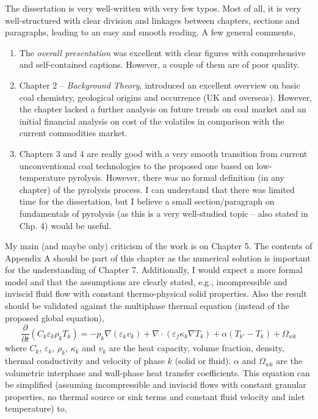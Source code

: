 \documentclass[14pt,twoside]{report}
\begin{document}
The dissertation is very well-written with very few typos. Most of all, it is very well-structured with clear division and linkages between chapters, sections and paragraphs, leading to an easy and smooth reading. A few general comments,
\begin{enumerate}
%
\item The {\it overall presentation} was excellent with clear figures with comprehensive and self-contained captions. However, a couple of them are of poor quality. 
%
\item Chapter 2 -- {\it Background Theory}, introduced an excellent overview on basic coal chemistry, geological origins and occurrence (UK and overseas). However, the chapter lacked a further analysis on future trends on coal market and an initial financial analysis on cost of the volatiles in comparison with the current commodities market.  
%
\item Chapters 3 and 4 are really good with a very smooth transition from current unconventional coal technologies to the proposed one based on low-temperature pyrolysis. However, there was no formal definition (in any chapter) of the pyrolysis process. I can understand that there was limited time for the dissertation, but I believe a small section/paragraph on fundamentals of pyrolysis (as this is a very well-studied topic -- also stated in Chp. 4) would be useful.  
%
\end{enumerate}
My main (and maybe only) criticism of the work is on Chapter 5. The contents of Appendix A should be part of this chapter as the numerical solution is important for the understanding of Chapter 7.  Additionally, I would expect a more formal model and that the assumptions are clearly stated, e.g., incompressible and inviscid fluid flow with constant thermo-physical solid properties. Also the result should be validated against the multiphase thermal equation (instead of the proposed global equation),
\begin{equation}
\displaystyle\frac{\partial}{\partial t}\left(C_{k}\varepsilon_{k}\rho_{k}T_{k}\right) = -p_{k}\nabla\left(\varepsilon_{k}v_{k}\right) + \nabla \cdot \left(\varepsilon_{f}\kappa_{k}\nabla T_{k}\right) + \alpha\left(T_{k'}-T_{k}\right) + \Omega_{wk}\label{thermal} 
\end{equation}
where $C_{k}$, $\varepsilon_{k}$, $\rho_{k}$, $\kappa_{k}$ and $v_{k}$ are the heat capacity, volume fraction, density, thermal conductivity and velocity of phase $k$ (solid or fluid). $\alpha$ and $\Omega_{wk}$ are the volumetric interphase and wall-phase heat transfer coefficients. This equation can be simplified (assuming incompressible and inviscid flows with constant granular properties, no thermal source or sink terms and constant fluid velocity and inlet temperature) to, 
\end{document}
